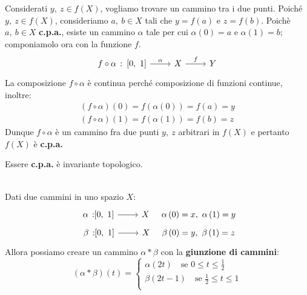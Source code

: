 \begin{demonstration}
	Considerati $y,\ z\in f\left(X\right)$, vogliamo trovare un cammino tra i due punti. Poiché $y,\ z\in f\left(X\right)$, consideriamo $a,\ b\in X$ tali che $y=f(a)$ e $z=f(b)$. Poichè $a,\ b\in X$ \textbf{c.p.a.}, esiste un cammino $\alpha$ tale per cui $\alpha\left(0\right)=a$ e $\alpha\left(1\right)=b$; componiamolo ora con la funzione $f$.
	\[
	\begin{tikzcd}
		{f\circ \alpha\ \colon \left[0,\ 1\right]} \arrow[r, "\alpha"] & X \arrow[r, "f"] & Y
	\end{tikzcd}
	\]
	La composizione $f\circ \alpha$ è continua perché composizione di funzioni continue, inoltre:
	\begin{gather*}
		\left(f\circ \alpha\right)\left(0\right)=f\left(\alpha\left(0\right)\right)=f\left(a\right)=y\\
		\left(f\circ \alpha\right)\left(1\right)=f\left(\alpha\left(1\right)\right)=f\left(b\right)=z
	\end{gather*}
	Dunque $f\circ \alpha$ è un cammino fra due punti $y,\ z$ arbitrari in $f\left(X\right)$ e pertanto $f\left(X\right)$ è \textbf{c.p.a.}
\end{demonstration}
\begin{observe}
	Essere \textbf{c.p.a.} è invariante topologico.
\end{observe}
\begin{define}~{}\\
	Dati due cammini in uno spazio $X$:
	\begin{gather*}
		\funz{\alpha}{\left[0,\ 1\right]}{X}\quad \alpha\left(0\right)=x,\ \alpha\left(1\right)=y\\
		\funz{\beta}{\left[0,\ 1\right]}{X}\quad \beta\left(0\right)=y,\ \beta\left(1\right)=z
	\end{gather*}
	Allora possiamo creare un cammino $\alpha \ast \beta$ con la \textbf{giunzione di cammini}:
	\begin{equation}
		\left(\alpha\ast\beta\right)\left(t\right)=\begin{cases}
			\alpha\left(2t\right)\quad\text{se }0\leq t\leq \frac{1}{2}\\
			\beta\left(2t-1\right)\quad\text{se }\frac{1}{2}\leq t\leq 1\\	
		\end{cases}
	\end{equation}
\end{define}
